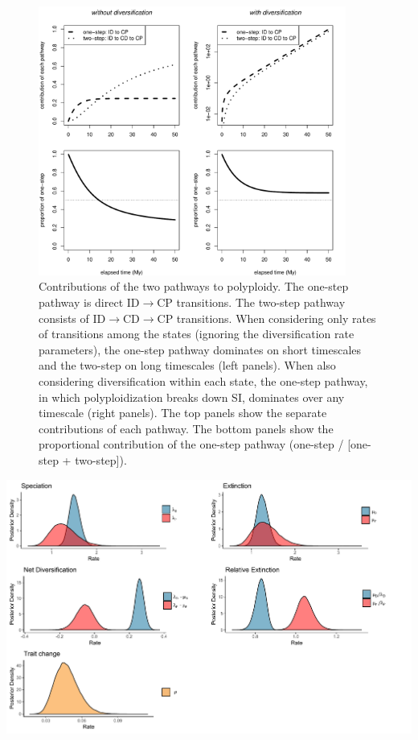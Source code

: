 \begin{figure}
    \centering \includegraphics[width=0.9\textwidth]{pathways}
    \caption{
        Contributions of the two pathways to polyploidy.
        The one-step pathway is direct ID$\rightarrow$CP transitions.
        The two-step pathway consists of ID$\rightarrow$CD$\rightarrow$CP transitions.
        When considering only rates of transitions among the states (ignoring the diversification rate parameters), the one-step pathway dominates on short timescales and the two-step on long timescales (left panels).
        When also considering diversification within each state, the one-step pathway, in which polyploidization breaks down SI, dominates over any timescale (right panels).
        The top panels show the separate contributions of each pathway.
        The bottom panels show the proportional contribution of the one-step pathway (\ie one-step / [one-step + two-step]).
    }
    \label{figure:pathways}
\end{figure}

\begin{suppfigure}
\includegraphics[width=\textwidth]{bisseDPnodipposteriordist.pdf}
\caption{Posterior distribution for each of the parameters in the D/P ploidy model} %
\label{suppfigure:DPnodip}
\end{suppfigure}

